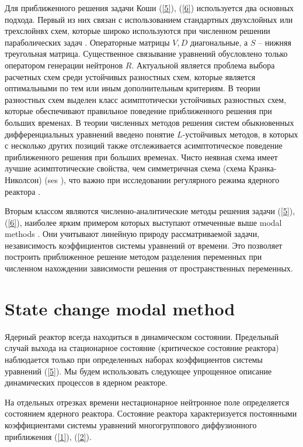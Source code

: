 \documentclass[authoryear]{elsarticle}
\begin{document}
Для приближенного решения задачи Коши (\ref{5}), (\ref{6}) 
используется два основных подхода. Первый из них связан с использованием стандартных
двухслойных или трехслойнвх схем, которые широко используются при численном решении параболических задач \citep{Samarskiibook}.
Операторные матрицы $V, D$ диагональные, а $S$ -- нижняя треугольная матрица. 
Существенное связывание уравнений обусловлено только оператором генерации нейтронов $R$.
Актуальной является проблема выбора расчетных схем среди устойчивых разностных схем, 
которые	является оптимальными по тем или иным дополнительным критериям. 
В теории разностных схем выделен класс асимптотически устойчивых 
разностных схем, которые \citep{samarskii1996computational} обеспечивают правильное
поведение приближенного решения при больших временах. 
В теории численных методов решения систем обыкновенных дифференциальных
уравнений \citep{Butcher2008,Gear1971} введено понятие $L$-устойчивых методов,
в которых с несколько других позиций также отслеживается 
асимптотическое поведение приближенного решения
при больших временах. Чисто неявная схема имеет лучшие асимптотические свойства,
чем симметричная схема (схема Кранка-Николсон) (ses \cite{VabishchevichSM}), 
что важно при исследовании регулярного режима ядерного реактора \citep{nd-mm}.

Вторым классом являются численно-аналитические методы решения задачи (\ref{5}), (\ref{6}),
наиболее ярким примером которых выступают отмеченные выше modal methods  \citep{stacey1967modal,stacey1969space,sutton1996diffusion}.
Они учитывают линейную природу рассматриваемой задачи, независимость коэффициентов 
системы уравнений от времени. Это позволяет построить приближенное решение методом разделения переменных
при численном нахождении зависимости решения от пространственных переменных.

\section{State change modal method} 

Ядерный реактор всегда находиться в динамическом состоянии.
Предельный случай выхода на стационарное состояние (критическое состояние реактора) 
наблюдается только при определенных наборах коэффициентов системы уравнений (\ref{5}). 
Мы будем использовать следующее упрощенное описание динамических процессов в ядерном реакторе.

На отдельных отрезках времени нестационарное нейтронное поле определяется состоянием ядерного реактора.
Состояние реактора характеризуется постоянными коэффициентами 
системы уравнений многогруппового диффузионного приближения (\ref{1}), (\ref{2}).
\end{document}
